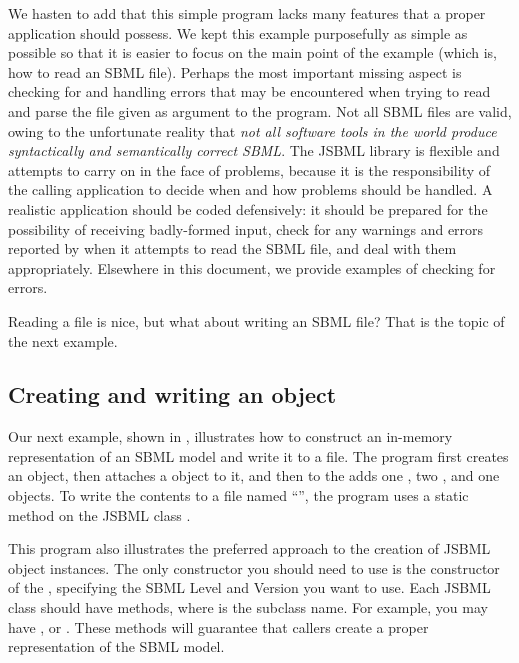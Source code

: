 We hasten to add that this simple program lacks many features that a proper
application should possess.  We kept this example purposefully as simple as
possible so that it is easier to focus on the main point of the example
(which is, how to read an SBML file).  Perhaps the most important missing
aspect is checking for and handling errors that may be encountered when
trying to read and parse the file given as argument to the program.  Not
all SBML files are valid, owing to the unfortunate reality that \emph{not
  all software tools in the world produce syntactically and semantically
  correct SBML}. The JSBML library is flexible and attempts to carry on in
the face of problems, because it is the responsibility of the calling
application to decide when and how problems should be handled. A realistic
application should be coded defensively: it should be prepared for the
possibility of receiving badly-formed input, check for any warnings and
errors reported by \SBMLReader when it attempts to read the SBML file, and
deal with them appropriately. Elsewhere in this document, we provide
examples of checking for errors.

Reading a file is nice, but what about writing an SBML file?  That is the
topic of the next example.



\subsection{Creating and writing an  object}

Our next example, shown in ,
illustrates how to construct an in-memory representation of an SBML model
and write it to a file. The program first creates an \SBMLDocument object,
then attaches a \Model object to it, and then to the \Model adds one
\Compartment, two \Species, and one \Reaction objects. To write the
contents to a file named ``'', the program uses a static
method on the JSBML class \SBMLWriter. 

This program also illustrates the preferred approach to the creation of JSBML object instances. 
The only constructor you should need to use is the constructor of the \SBMLDocument, specifying
the SBML Level and Version you want to use. Each JSBML class should have  
 methods, where  is the subclass name. 
For example, you may have , 
or . These methods will guarantee that callers create a proper
representation of the SBML model.  

